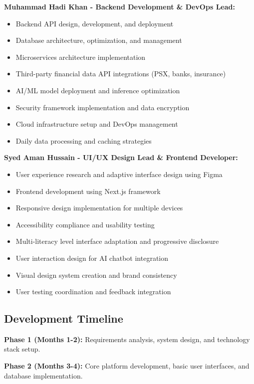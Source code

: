 \documentclass[12pt]{article}
\begin{document}
\textbf{Muhammad Hadi Khan - Backend Development \& DevOps Lead:}
\begin{itemize}
    \item Backend API design, development, and deployment
    \item Database architecture, optimization, and management
    \item Microservices architecture implementation
    \item Third-party financial data API integrations (PSX, banks, insurance)
    \item AI/ML model deployment and inference optimization
    \item Security framework implementation and data encryption
    \item Cloud infrastructure setup and DevOps management
    \item Daily data processing and caching strategies
\end{itemize}

\textbf{Syed Aman Hussain - UI/UX Design Lead \& Frontend Developer:}
\begin{itemize}
    \item User experience research and adaptive interface design using Figma
    \item Frontend development using Next.js framework
    \item Responsive design implementation for multiple devices
    \item Accessibility compliance and usability testing
    \item Multi-literacy level interface adaptation and progressive disclosure
    \item User interaction design for AI chatbot integration
    \item Visual design system creation and brand consistency
    \item User testing coordination and feedback integration
\end{itemize}

\subsection{Development Timeline}

\textbf{Phase 1 (Months 1-2):} Requirements analysis, system design, and technology stack setup.

\textbf{Phase 2 (Months 3-4):} Core platform development, basic user interfaces, and database implementation.
\end{document}

